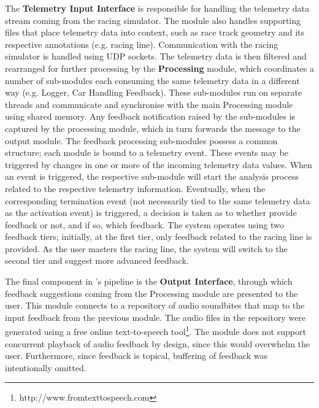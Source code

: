\documentclass{sig-alternate}
\begin{document}
{The \textbf {Telemetry Input Interface} is responsible for handling the telemetry data stream coming from the racing simulator. The module also handles supporting files that place telemetry data into context, such as race track geometry and its respective annotations (e.g. racing line). Communication with the racing simulator is handled using UDP sockets. 
The telemetry data is then filtered and rearranged for further processing by the \textbf{Processing} module, which coordinates a number of sub-modules each consuming the same telemetry data in a different way (e.g. Logger, Car Handling Feedback). These sub-modules run on separate threads and communicate and synchronise with the main Processing module using shared memory. Any feedback notification raised by the sub-modules is captured by the processing module, which in turn forwards the message to the output module. The feedback processing sub-modules possess a common structure; each module is bound to a telemetry event. These events may be triggered by changes in one or more of the incoming telemetry data values. When an event is triggered, the respective sub-module will start the analysis process related to the respective telemetry information. Eventually, when the corresponding termination event (not necessarily tied to the same telemetry data as the activation event) is triggered, a decision is taken as to whether provide feedback or not, and if so, which feedback. The system operates using two feedback tiers; initially, at the first tier, only feedback related to the racing line is provided. As the user masters the racing line, the system will switch to the second tier and suggest more advanced feedback.

The final component in \methodname's pipeline is the \textbf{Output Interface}, through which feedback suggestions coming from the Processing module are presented to the user. This module connects to a repository of audio soundbites that map to the input feedback from the previous module. The audio files in the repository were generated using a free online text-to-speech tool\footnote{http://www.fromtexttospeech.com}. The module does not support concurrent playback of audio feedback by design, since this would overwhelm the user. Furthermore, since feedback is topical, buffering of feedback was intentionally omitted.

}
\end{document}

